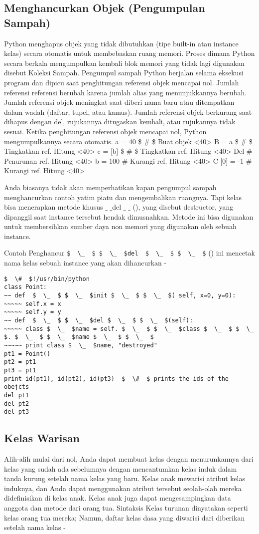 \subsection{Menghancurkan Objek (Pengumpulan Sampah)}
Python menghapus objek yang tidak dibutuhkan (tipe built-in atau instance kelas) secara otomatis untuk membebaskan ruang memori. Proses dimana Python secara berkala mengumpulkan kembali blok memori yang tidak lagi digunakan disebut Koleksi Sampah. Pengumpul sampah Python berjalan selama eksekusi program dan dipicu saat penghitungan referensi objek mencapai nol. Jumlah referensi referensi berubah karena jumlah alias yang menunjukkannya berubah. Jumlah referensi objek meningkat saat diberi nama baru atau ditempatkan dalam wadah (daftar, tupel, atau kamus). Jumlah referensi objek berkurang saat dihapus dengan del, rujukannya ditugaskan kembali, atau rujukannya tidak sesuai. Ketika penghitungan referensi objek mencapai nol, Python mengumpulkannya secara otomatis.
a = 40  \$  \#  \$ Buat objek <40>
B = a  \$  \#  \$ Tingkatkan ref. Hitung <40>
c = [b]  \$  \#  \$ Tingkatkan ref. Hitung <40>
Del  $  \#  $ Penurunan ref. Hitung <40>
b = 100  $  \#  $ Kurangi ref. Hitung <40>
C [0] = -1  $  \#  $ Kurangi ref. Hitung <40>

Anda biasanya tidak akan memperhatikan kapan pengumpul sampah menghancurkan contoh yatim piatu dan mengembalikan ruangnya. Tapi kelas bisa menerapkan metode khusus  $  \_  $ $  \_  $del  $  \_  $ $  \_ $ (), yang disebut destructor, yang dipanggil saat instance tersebut hendak dimusnahkan. Metode ini bisa digunakan untuk membersihkan sumber daya non memori yang digunakan oleh sebuah instance. \par

Contoh
Penghancur  \verb|$  \_  $ $  \_  $del  $  \_  $ $  \_  $| () ini mencetak nama kelas sebuah instance yang akan dihancurkan -
\begin{verbatim}
$  \#  $!/usr/bin/python
class Point:
~~ def  $  \_  $ $  \_  $init $  \_  $ $  \_  $( self, x=0, y=0):
~~~~~ self.x = x
~~~~~ self.y = y
~~ def  $  \_  $ $  \_  $del $  \_  $ $  \_  $(self):
~~~~~ class $  \_  $name = self. $  \_  $ $  \_  $class $  \_  $ $  \_  $. $  \_  $ $  \_  $name $  \_  $ $  \_  $
~~~~~ print class $  \_  $name, "destroyed"
pt1 = Point()
pt2 = pt1
pt3 = pt1
print id(pt1), id(pt2), id(pt3)  $  \#  $ prints the ids of the obejcts
del pt1
del pt2
del pt3
\end{verbatim}

\subsection{Kelas Warisan}
Alih-alih mulai dari nol, Anda dapat membuat kelas dengan menurunkannya dari kelas yang sudah ada sebelumnya dengan mencantumkan kelas induk dalam tanda kurung setelah nama kelas yang baru. Kelas anak mewarisi atribut kelas induknya, dan Anda dapat menggunakan atribut tersebut seolah-olah mereka didefinisikan di kelas anak. Kelas anak juga dapat mengesampingkan data anggota dan metode dari orang tua. Sintaksis Kelas turunan dinyatakan seperti kelas orang tua mereka; Namun, daftar kelas dasa yang diwarisi dari diberikan setelah nama kelas -

